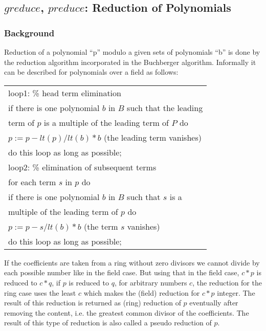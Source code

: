 \subsection{$greduce$, $preduce$: Reduction of Polynomials}

\subsubsection{Background} \label{groebner:background}
Reduction of a polynomial ``p'' modulo a given sets of polynomials
``b'' is done by the reduction algorithm incorporated in the
Buchberger algorithm. Informally it can be described for
polynomials over a field as follows:
\begin{center}
\begin{tabular}{l}
loop1: \hspace*{2mm}\% head term elimination \\
\hspace*{-1cm} if there is one polynomial $b$ in $B$ such that the
leading \\ term of $p$ is a multiple of the leading term of $P$ do \\
$p := p - lt(p)/lt(b) * b$  (the leading term vanishes)\\
\hspace*{-1cm} do this loop as long as possible; \\
loop2: \hspace*{2mm} \% elimination of subsequent terms \\
\hspace*{-1cm} for each term $s$ in $p$ do \\
if there is one polynomial $b$ in $B$ such that $s$ is a\\
multiple of the leading term of $p$ do \\
$p := p - s/lt(b) * b$ (the term $s$ vanishes) \\
\hspace*{-1cm}do this loop as long as possible;
\end{tabular}
\end{center}

If the coefficients are taken from a ring without zero divisors we
cannot divide by each possible number like in the field case. But
using that in the field case,  $c*p $ is reduced to  $c*q $, if $ p $
is reduced to $ q $, for arbitrary numbers $ c $,  the reduction for
the ring case uses the least $ c $ which makes the (field) reduction
for $ c*p $ integer. The result of this reduction is returned as
(ring) reduction of $ p $ eventually after removing the content, i.e.
the greatest common divisor of the coefficients. The result of this
type of reduction is also called a pseudo reduction of $ p $.

